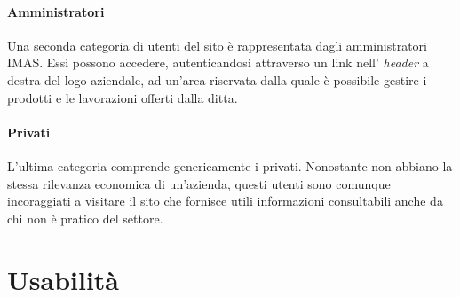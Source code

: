 \documentclass[11pt]{article}
\begin{document}
\paragraph{Amministratori}
Una seconda categoria di utenti del sito è rappresentata dagli amministratori IMAS. Essi possono accedere, autenticandosi attraverso un link nell' \textit{header} a destra del logo aziendale, ad un'area riservata dalla quale è possibile gestire i prodotti e le lavorazioni offerti dalla ditta.

\paragraph{Privati}
L'ultima categoria comprende genericamente i privati. Nonostante non abbiano la stessa rilevanza economica di un'azienda, questi utenti sono comunque incoraggiati a visitare il sito che fornisce utili informazioni consultabili anche da chi non è pratico del settore.

\newpage
\section{Usabilità}
\end{document}
